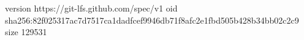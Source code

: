version https://git-lfs.github.com/spec/v1
oid sha256:82f025317ac7d7517ca1dadfcef9946db71f8afc2e1fbd505b428b34bb02c2c9
size 129531

